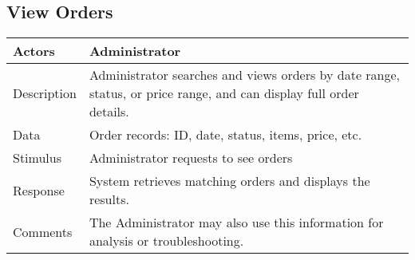 \documentclass{report}
\begin{document}
    \pagebreak 
    \subsection{View Orders}
    \bigbreak \noindent 
    \begin{center}
        \begin{tabular}{|p{4cm}|p{8cm}|}
            \hline
            Actors & 
            Administrator \\
            \hline
            Description & 
            Administrator searches and views orders by date range, status, 
            or price range, and can display full order details. \\
            \hline
            Data & 
            Order records: ID, date, status, items, price, etc. \\
            \hline
            Stimulus & 
            Administrator requests to see orders \\
            \hline
            Response & 
            System retrieves matching orders and displays the results. \\
            \hline
            Comments & 
            The Administrator may also use this information for analysis 
            or troubleshooting. \\
            \hline
        \end{tabular}
    \end{center}
\end{document}
